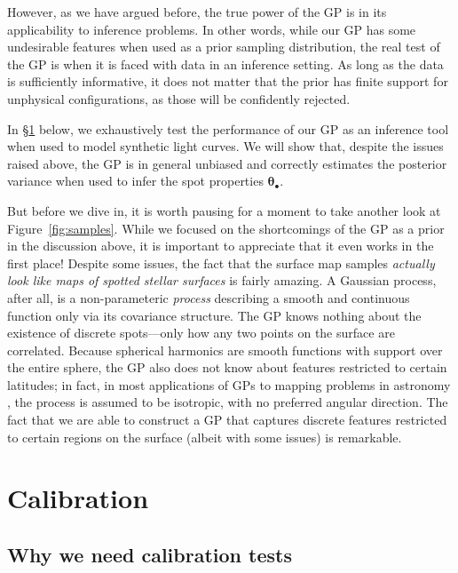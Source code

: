 \documentclass[modern]{aastex62}
\begin{document}
However, as we have argued before, the true power of the GP is in its
applicability to inference problems. In other words, while our GP has some
undesirable features when used as a prior sampling distribution, the real test
of the GP is when it is faced with data in an inference setting.
As long as the data is sufficiently informative, it does not matter that the
prior has finite support for unphysical configurations, as those
will be confidently rejected.

In \S\ref{sec:calibration} below, we exhaustively test the performance of our
GP as an inference tool when used to model synthetic light curves. We will
show that, despite the issues raised above, the GP is in general unbiased and
correctly estimates the posterior variance when used to infer the spot
properties $\pmb{\theta}_\bullet$.

But before we dive in, it is worth pausing for a moment to take another
look at Figure~\ref{fig:samples}. While we focused on the shortcomings of
the GP as a prior in the discussion above, it is important to appreciate
that it even works in the first place! Despite some issues, the fact that
the surface map samples \emph{actually look like maps of spotted stellar surfaces}
is fairly amazing. A Gaussian process, after all, is a non-parameteric
\emph{process} describing a smooth and continuous function only via its
covariance structure. The GP knows nothing about the existence of discrete
spots---only how any two points on the surface are correlated.
Because spherical harmonics are smooth functions with support over the
entire sphere, the GP also does not know about features restricted
to certain latitudes; in fact, in most applications of GPs to mapping
problems in astronomy \citep[such as in models of the cosmic microwave
    background][]{?}, the process is assumed to be isotropic,
with no preferred angular direction.
The fact that we are able to construct a GP that captures discrete
features restricted to certain regions on the surface (albeit with
some issues) is remarkable.

\section{Calibration}
\label{sec:calibration}

\subsection{Why we need calibration tests}
\label{sec:why-calibrate}
\end{document}
